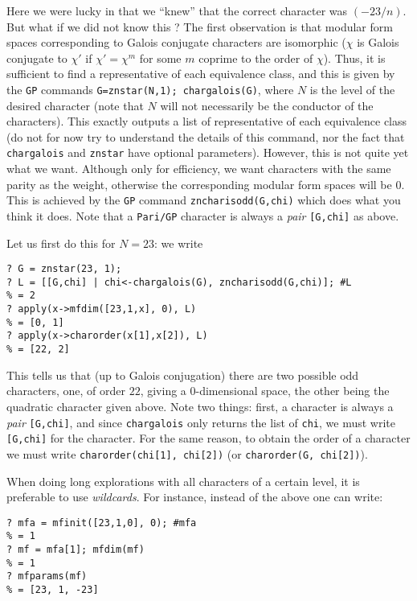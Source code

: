 \documentclass[11pt]{article}
\def\kbd#1{{\tt #1}}
\begin{document}
Here we were lucky in that we ``knew'' that the correct character was
$(-23/n)$. But what if we did not know this ? The first observation is
that modular form spaces corresponding to Galois conjugate characters
are isomorphic ($\chi$ is Galois conjugate to $\chi'$ if $\chi'=\chi^m$
for some $m$ coprime to the order of $\chi$). Thus, it is sufficient
to find a representative of each equivalence class, and this is given by
the \kbd{GP} commands \kbd{G=znstar(N,1); chargalois(G)}, where $N$ is the
level of the desired character (note that $N$ will not necessarily be
the conductor of the characters). This exactly outputs a list of representative
of each equivalence class (do not for now try to understand the details of
this command, nor the fact that \kbd{chargalois} and \kbd{znstar} have
optional parameters). However, this is not quite yet what we want.
Although only for efficiency, we want characters with the same parity
as the weight, otherwise the corresponding modular form spaces will be $0$.
This is achieved by the \kbd{GP} command \kbd{zncharisodd(G,chi)} which
does what you think it does. Note that a \kbd{Pari/GP} character is always
a \emph{pair} \kbd{[G,chi]} as above.

Let us first do this for $N=23$: we write

\begin{verbatim}
? G = znstar(23, 1);
? L = [[G,chi] | chi<-chargalois(G), zncharisodd(G,chi)]; #L
% = 2
? apply(x->mfdim([23,1,x], 0), L)
% = [0, 1]
? apply(x->charorder(x[1],x[2]), L)
% = [22, 2]
\end{verbatim}

This tells us that (up to Galois conjugation) there are two possible odd
characters, one, of order $22$, giving a $0$-dimensional space, the other
being the quadratic character given above. Note two things: first, a character
is always a \emph{pair} \kbd{[G,chi]}, and since \kbd{chargalois} only
returns the list of \kbd{chi}, we must write \kbd{[G,chi]} for the character.
For the same reason, to obtain the order of a character we must write
\kbd{charorder(chi[1], chi[2])} (or \kbd{charorder(G, chi[2])}).

When doing long explorations with all characters of a certain level, it
is preferable to use \emph{wildcards}. For instance, instead of the above
one can write:

\begin{verbatim}
? mfa = mfinit([23,1,0], 0); #mfa
% = 1
? mf = mfa[1]; mfdim(mf)
% = 1
? mfparams(mf)
% = [23, 1, -23]
\end{verbatim}
\end{document}
